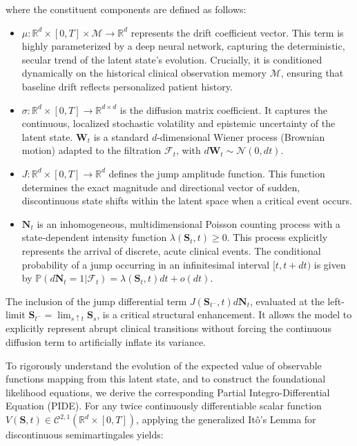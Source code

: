 where the constituent components are defined as follows:
\begin{itemize}
    \item $\mu: \mathbb{R}^d \times [0, T] \times \mathcal{M} \rightarrow \mathbb{R}^d$ represents the drift coefficient vector. This term is highly parameterized by a deep neural network, capturing the deterministic, secular trend of the latent state's evolution. Crucially, it is conditioned dynamically on the historical clinical observation memory $\mathcal{M}$, ensuring that baseline drift reflects personalized patient history.
    \item $\sigma: \mathbb{R}^d \times [0, T] \rightarrow \mathbb{R}^{d \times d}$ is the diffusion matrix coefficient. It captures the continuous, localized stochastic volatility and epistemic uncertainty of the latent state. $\mathbf{W}_t$ is a standard $d$-dimensional Wiener process (Brownian motion) adapted to the filtration $\mathcal{F}_t$, with $d\mathbf{W}_t \sim \mathcal{N}(0, dt)$.
    \item $J: \mathbb{R}^d \times [0, T] \rightarrow \mathbb{R}^d$ defines the jump amplitude function. This function determines the exact magnitude and directional vector of sudden, discontinuous state shifts within the latent space when a critical event occurs.
    \item $\mathbf{N}_t$ is an inhomogeneous, multidimensional Poisson counting process with a state-dependent intensity function $\lambda(\mathbf{S}_t, t) \geq 0$. This process explicitly represents the arrival of discrete, acute clinical events. The conditional probability of a jump occurring in an infinitesimal interval $[t, t+dt)$ is given by $\mathbb{P}(d\mathbf{N}_t = 1 | \mathcal{F}_t) = \lambda(\mathbf{S}_t, t) dt + o(dt)$.
\end{itemize}

The inclusion of the jump differential term $J(\mathbf{S}_{t^-}, t) d\mathbf{N}_t$, evaluated at the left-limit $\mathbf{S}_{t^-} = \lim_{s \uparrow t} \mathbf{S}_s$, is a critical structural enhancement. It allows the model to explicitly represent abrupt clinical transitions without forcing the continuous diffusion term to artificially inflate its variance.

To rigorously understand the evolution of the expected value of observable functions mapping from this latent state, and to construct the foundational likelihood equations, we derive the corresponding Partial Integro-Differential Equation (PIDE). For any twice continuously differentiable scalar function $V(\mathbf{S}, t) \in \mathcal{C}^{2,1}(\mathbb{R}^d \times [0, T])$, applying the generalized Itô's Lemma for discontinuous semimartingales yields:

